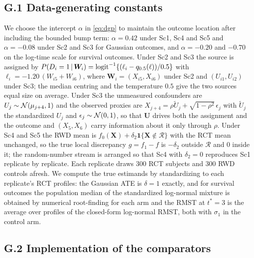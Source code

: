 \subsection*{G.1 Data-generating constants}

We choose the intercept $\alpha$ in \eqref{eq:dgp} to maintain the outcome location after including the bounded bump term: $\alpha=0.42$ under Sc1, Sc4 and Sc5 and $\alpha=-0.08$ under Sc2 and Sc3 for Gaussian outcomes, and $\alpha=-0.20$ and $-0.70$ on the log-time scale for survival outcomes. Under Sc2 and Sc3 the source is assigned by $P(D_i=1\,\vert\,\bm W_i)=\mathrm{logit}^{-1}\{(\ell_i-q_{0.5}(\ell))/0.5\}$ with $\ell_i=-1.20\,(W_{i5}+W_{i6})$, where $\bm W_i=(X_{i5},X_{i6})$ under Sc2 and $(U_{i1},U_{i2})$ under Sc3; the median centring and the temperature $0.5$ give the two sources equal size on average. Under Sc3 the unmeasured confounders are $U_j\sim\mathcal{N}(\mu_{j+4},1)$ and the observed proxies are $X_{j+4}=\rho\tilde U_j+\sqrt{1-\rho^2}\,\epsilon_j$ with $\tilde U_j$ the standardized $U_j$ and $\epsilon_j\sim\mathcal{N}(0,1)$, so that $\bm U$ drives both the assignment and the outcome and $(X_5,X_6)$ carry information about it only through $\rho$. Under Sc4 and Sc5 the RWD mean is $f_0(\bm X)+\delta_2\mathbf 1\{\bm X\notin\mathcal R\}$ with the RCT mean unchanged, so the true local discrepancy $g=f_1-f$ is $-\delta_2$ outside $\mathcal R$ and $0$ inside it; the random-number stream is arranged so that Sc4 with $\delta_2=0$ reproduces Sc1 replicate by replicate. Each replicate draws $300$ RCT subjects and $300$ RWD controls afresh. We compute the true estimands by standardizing to each replicate's RCT profiles: the Gaussian ATE is $\delta=1$ exactly, and for survival outcomes the population median of the standardized log-normal mixture is obtained by numerical root-finding for each arm and the RMST at $t^\ast=3$ is the average over profiles of the closed-form log-normal RMST, both with $\sigma_1$ in the control arm.

\subsection*{G.2 Implementation of the comparators}

